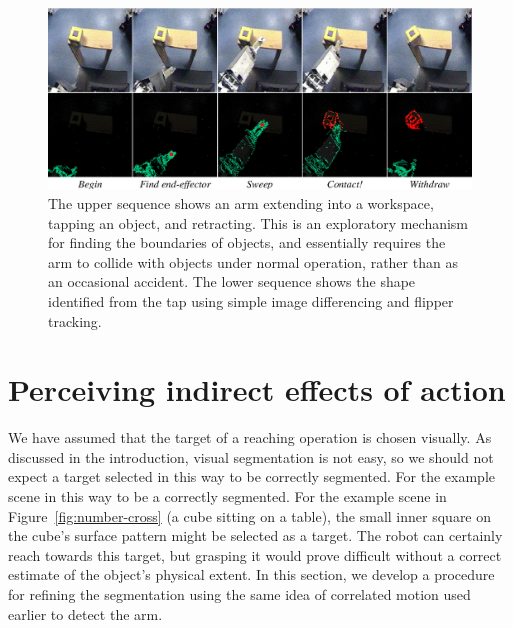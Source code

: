 
\begin{figure}[tbh]
\begin{center}
\includegraphics[width=\textwidth]{poking-sequence.eps}
\caption{ 
%
  The upper sequence shows an arm extending into a workspace, tapping
  an object, and retracting.  This is an exploratory mechanism for
  finding the boundaries of objects, and essentially requires the arm
  to collide with objects under normal operation, rather than as an
  occasional accident.  The lower sequence shows the shape
  identified from the tap using simple image differencing and flipper
  tracking.
%
}
\label{fig:poking-sequence}
\end{center}
\end{figure}


\section{Perceiving indirect effects of action}
\label{sec:poking}

We have assumed that the target of a reaching operation is chosen
visually.  As discussed in the introduction, visual
segmentation is not easy, so we should not expect a target selected in
\ifrev
this way to be correctly segmented.  For the example scene in
\else
this way to be a correctly segmented.  For the example scene in
\fi
Figure~\ref{fig:number-cross} 
(a cube sitting on a table), the small
inner square on the cube's surface pattern might be selected as a
target.  The robot can certainly reach towards this target, but
grasping it would prove difficult without a correct estimate of the
object's physical extent.  In this section, we develop a procedure
for refining the segmentation using the same idea of correlated
motion used earlier to detect the arm.

